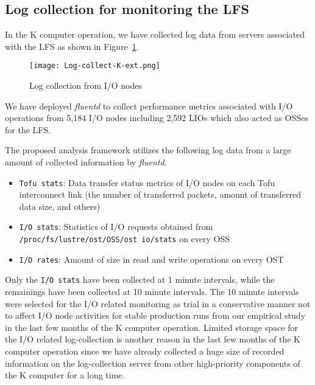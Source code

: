 \documentclass{jhps}
\begin{document}
\subsection{Log collection for monitoring the LFS}

In the K computer operation, we have collected log data from servers associated with the LFS as shown in Figure~\ref{fig:Log-collect-K}.
%
\begin{figure}[tb]
\centering
\texttt{[image: Log-collect-K-ext.png]}
\caption{Log collection from I/O nodes}
\label{fig:Log-collect-K}
\end{figure}
%
We have deployed {\itshape fluentd} to collect performance metrics associated with
I/O operations from 5,184 I/O nodes including 2,592 LIOs which also acted as OSSes for the LFS.


The proposed analysis framework utilizes the following log data from a large amount of collected information by {\itshape fluentd}.
%
\begin{itemize}
\item {\tt Tofu stats}: Data transfer status metrics of I/O nodes on each Tofu interconnect link
(the number of transferred packets, amount of transferred data size, and others)
\item {\tt I/O stats}: Statistics of I/O requests obtained from
{\tt /proc/fs/lustre/ost/OSS/ost io/stats} on every OSS
\item {\tt I/O rates}: Amount of size in read and write operations on every OST
\end{itemize}
%
Only the {\tt I/O stats} have been collected at 1 minute intervals, while the remainings have been
collected at 10 minute intervals.
The 10 minute intervals were selected for the I/O related monitoring as trial
in a conservative manner not to affect I/O node activities for stable production runs
from our empirical study in the last few months of the K computer operation.
Limited storage space for the I/O related log-collection is another reason
in the last few months of the K computer operation since we have already collected
a huge size of recorded information on the log-collection server
from other high-priority components of the K computer for a long time.
\end{document}

